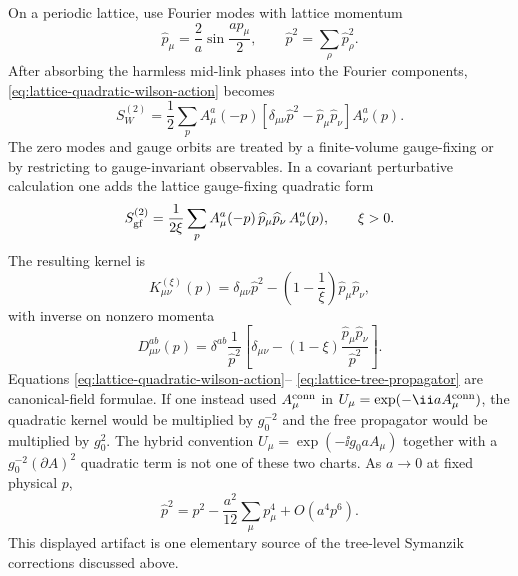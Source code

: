 On a periodic lattice, use Fourier modes with lattice momentum
\begin{equation}
  \widehat p_\mu=\frac{2}{a}\sin\frac{ap_\mu}{2},
  \qquad
  \widehat p^2=\sum_\rho \widehat p_\rho^2.
  \label{eq:lattice-hat-momentum}
\end{equation}
After absorbing the harmless mid-link phases into the Fourier components,
\eqref{eq:lattice-quadratic-wilson-action} becomes
\begin{equation}
  S_W^{(2)}
  =
  \frac12
  \sum_p
  A_\mu^a(-p)
  \left[
    \delta_{\mu\nu}\widehat p^2-\widehat p_\mu\widehat p_\nu
  \right]
  A_\nu^a(p).
  \label{eq:lattice-transverse-quadratic-kernel}
\end{equation}
The zero modes and gauge orbits are treated by a finite-volume gauge-fixing
or by restricting to gauge-invariant observables.  In a covariant perturbative
calculation one adds the lattice gauge-fixing quadratic form
\begin{equation}
  S_{\rm gf}^{(2)}
  =
  \frac{1}{2\xi}
  \sum_p
  A_\mu^a(-p)\,\widehat p_\mu\widehat p_\nu\,A_\nu^a(p),
  \qquad \xi>0 .
  \label{eq:lattice-covariant-gauge-fixing-quadratic}
\end{equation}
The resulting kernel is
\begin{equation}
  K_{\mu\nu}^{(\xi)}(p)
  =
  \delta_{\mu\nu}\widehat p^2
  -
  \left(1-\frac1\xi\right)\widehat p_\mu\widehat p_\nu,
  \label{eq:lattice-gauge-fixed-kernel}
\end{equation}
with inverse on nonzero momenta
\begin{equation}
  D_{\mu\nu}^{ab}(p)
  =
  \delta^{ab}
  \frac{1}{\widehat p^2}
  \left[
    \delta_{\mu\nu}
    -
    (1-\xi)\frac{\widehat p_\mu\widehat p_\nu}{\widehat p^2}
  \right].
  \label{eq:lattice-tree-propagator}
\end{equation}
Equations \eqref{eq:lattice-quadratic-wilson-action}--
\eqref{eq:lattice-tree-propagator} are canonical-field formulae.  If one
instead used \(A_\mu^{\rm conn}\) in
\(U_\mu=\exp(-\ii aA_\mu^{\rm conn})\), the quadratic kernel would be
multiplied by \(g_0^{-2}\) and the free propagator would be multiplied by
\(g_0^2\).  The hybrid convention \(U_\mu=\exp(-\ii g_0aA_\mu)\) together with
a \(g_0^{-2}(\partial A)^2\) quadratic term is not one of these two charts.
As \(a\to0\) at fixed physical \(p\),
\begin{equation}
  \widehat p^2
  =
  p^2-\frac{a^2}{12}\sum_\mu p_\mu^4+O(a^4p^6).
  \label{eq:lattice-hat-momentum-expansion}
\end{equation}
This displayed artifact is one elementary source of the tree-level Symanzik
corrections discussed above.

